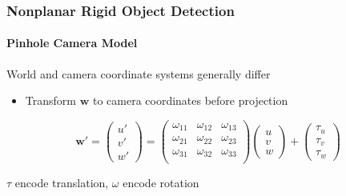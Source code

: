 \documentclass[xetex,professionalfont]{beamer}
\renewcommand{\vec}[1]{\ensuremath{\mathbf{#1}}}
\newcommand{\vw}{\vec{w}}
\begin{document}
\begin{frame}
\frametitle{Nonplanar Rigid Object Detection}
\framesubtitle{Pinhole Camera Model}

World and camera coordinate systems generally differ
\begin{itemize}
    \item Transform $\vw$ to camera coordinates before projection
\end{itemize}

\[
    \vw' =
    \begin{pmatrix}
        u' \\ v' \\ w'
    \end{pmatrix} =
    \begin{pmatrix}
        \omega_{11} & \omega_{12} & \omega_{13} \\
        \omega_{21} & \omega_{22} & \omega_{23} \\
        \omega_{31} & \omega_{32} & \omega_{33} \\
    \end{pmatrix}
    \begin{pmatrix}
        u \\ v \\ w
    \end{pmatrix} +
    \begin{pmatrix}
        \tau_u \\ \tau_v \\ \tau_w
    \end{pmatrix}
\]

\medskip
$\tau$ encode translation, $\omega$ encode rotation

\end{frame}

\end{document}
